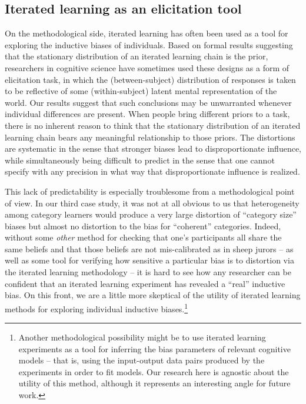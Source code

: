 \documentclass[doc]{apa6}
\begin{document}
\subsection{Iterated learning as an elicitation tool}

On the methodological side, iterated learning has often been used as a tool for exploring the inductive biases of individuals. Based on formal results suggesting that the stationary distribution of an iterated learning chain is the prior, researchers in cognitive science have sometimes used these designs as a form of elicitation task, in which the (between-subject) distribution of responses is taken to be reflective of some (within-subject) latent mental representation of the world. Our results suggest that such conclusions may be unwarranted whenever individual differences are present. When people bring different priors to a task, there is no inherent reason to think that the stationary distribution of an iterated learning chain bears any meaningful relationship to those priors. The distortions are systematic in the sense that stronger biases lead to disproportionate influence, while simultaneously being difficult to predict in the sense that one cannot specify with any precision in what way that disproportionate influence is realized. 

This lack of predictability is especially troublesome from a methodological point of view. In our third case study, it was not at all obvious to us that heterogeneity among category learners would produce a very large distortion of ``category size'' biases but almost no distortion to the bias for ``coherent'' categories. Indeed, without some {\it other} method for checking that one's participants all share the same beliefs and that those beliefs are not mis-calibrated as in {\sc sheep} jurors -- as well as some tool for verifying how sensitive a particular bias is to distortion via the iterated learning methodology -- it is hard to see how any researcher can be confident that an iterated learning experiment has revealed a ``real'' inductive bias. On this front, we are a little more skeptical of the utility of iterated learning methods for exploring individual inductive biases.\footnote{Another methodological possibility might be to use iterated learning experiments as a tool for inferring the bias parameters of relevant cognitive models -- that is, using the input-output data pairs produced by the experiments in order to fit models. Our research here is agnostic about the utility of this method, although it represents an interesting angle for future work.}
\end{document}
